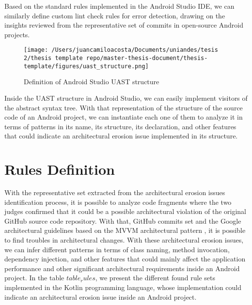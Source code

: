 Based on the standard rules implemented in the Android Studio IDE, we can similarly define custom lint check rules for error detection, drawing on the insights reviewed from the representative set of commits in open-source Android projects. 

\begin{figure}[h]
    	\centering
    		\texttt{[image: /Users/juancamiloacosta/Documents/uniandes/tesis 2/thesis template repo/master-thesis-document/thesis-template/figures/uast\_structure.png]}
   			 \caption{Definition of Android Studio UAST structure \citet{} }
   			 \label{fig:ast}
\end{figure}

Inside the UAST structure in Android Studio, we can easily implement visitors of the abstract syntax tree. With that representation of the structure of the source code of an Android project, we can instantiate each one of them to analyze it in terms of patterns in its name, its structure, its declaration, and other features that could indicate an architectural erosion issue implemented in its structure.

\section{Rules Definition}
With the representative set extracted from the architectural erosion issues identification process, it is possible to analyze code fragments where the two judges confirmed that it could be a possible architectural violation of the original GitHub source code repository. With that, GitHub commits set and the Google architectural guidelines based on the MVVM architectural pattern \citet{google-architecture}, it is possible to find troubles in architectural changes. With these architectural erosion issues, we can infer different patterns in terms of class naming, method invocation, dependency injection, and other features that could mainly affect the application performance and other significant architectural requirements inside an Android project. In the table $table_rules$, we present the different found rule sets implemented in the Kotlin programming language, whose implementation could indicate an architectural erosion issue inside an Android project.


